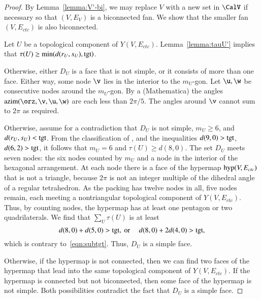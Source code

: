 \documentclass{llncs}
\def\op#1{{\hbox{#1}}}
\begin{document}
\begin{proof}
  By Lemma~\ref{lemma:V'-bi}, we may replace $V$ with a new set in
  $\CalV$ if necessary so that $(V,E_V)$ is a biconnected fan.
   We  show that the smaller
  fan $(V,E_{ctc})$ is also biconnected.

  Let $U$ be a topological component of $Y(V,E_{ctc})$.  Lemma~\ref{lemma:tauU'}
   implies that $\tau(U)\ge \min(d(r_U,s_U),\op{tgt})$.

    Otherwise,
   either $D_U$ is a face that is not simple, or it consists of more than
   one face.  Either way, some node $\v$ lies in the interior to the
   $m_U$-gon.  Let $\u,\w$ be consecutive nodes around the $m_U$-gon.
   By a %
  {(Mathematica)} the angles
   $\op{azim}(\orz,\v,\u,\w)$ are each less than $2\pi/5$. The angles
   around $\v$ cannot sum to $2\pi$ as required.

     Otherwise, assume
   for a contradiction that $D_U$ is not simple, $m_U\ge 6$, and
   $d(r_U,s_U)<\op{tgt}$.  From the classification of
   \cite[p.~126,~Fig.~12.1]{Hales:2006:DCG}, and the inequalities
   $d(9,0) > \op{tgt}$, $d(6,2) > \op{tgt}$, it follows that 
    $m_U=6$ and $\tau(U)\ge d(8,0)$.  The set $D_U$ meets seven
   nodes: the six nodes counted by $m_U$ and a node in the interior of
   the hexagonal arrangement.  At each node there is a face of the
   hypermap $\op{hyp}(V,E_{ctc})$ that is not a triangle, because
   $2\pi$ is not an integer multiple of the dihedral angle of a
   regular tetrahedron.  As the packing has twelve nodes in all, five
   nodes remain, each meeting a nontriangular topological component of
   $Y(V,E_{ctc})$.  Thus, by counting nodes, the hypermap has at least
   one pentagon or two quadrilaterals.  We find that $\sum_{U}
   \tau(U)$ is at least
\[
d(8,0) + d(5,0) > \op{tgt}, \text{ or }\quad d(8,0) + 2 d(4,0) > \op{tgt},
\]
which is contrary to~\eqref{eqn:subtgt}.
Thus, $D_U$ is a simple face.
%
%

  Otherwise, if the hypermap is
not connected, then we can find two faces of the hypermap that lead
into the same topological component of $Y(V,E_{ctc})$.  If the
hypermap is connected but not biconnected, then some face of the
hypermap is not simple.  Both possibilities contradict the fact that
$D_U$ is a simple face.
\end{proof}
\end{document}
